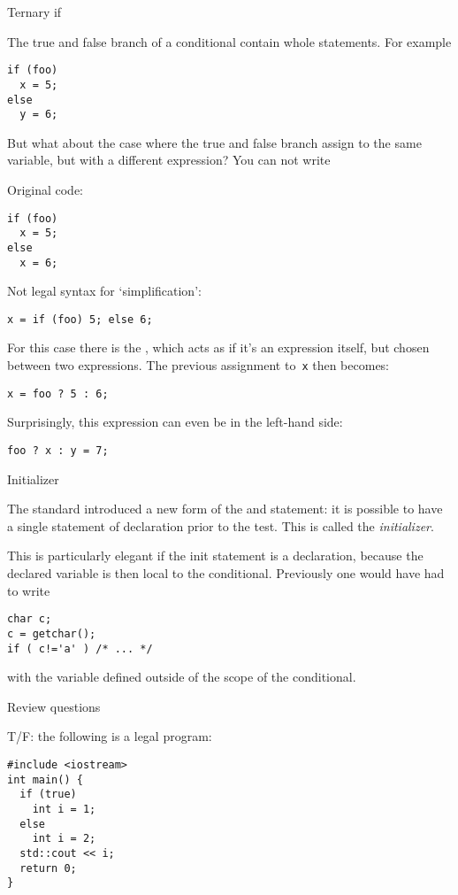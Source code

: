  {Ternary if}

The true and false branch of a conditional contain whole statements.
For example
\begin{lstlisting}
if (foo)
  x = 5;
else
  y = 6;
\end{lstlisting}
But what about the case where the true and false branch
assign to the same variable, but with a different expression?
You can not write
\begin{multicols}{2}
Original code:
\begin{lstlisting}
if (foo)
  x = 5;
else
  x = 6;
\end{lstlisting}
\columnbreak
Not legal syntax for `simplification':
\begin{lstlisting}
x = if (foo) 5; else 6; 
\end{lstlisting}
\end{multicols}
For this case there is the ,
which acts as if it's an expression itself, but chosen
between two expressions.
The previous assignment to~\lstinline{x} then becomes:
\begin{lstlisting}
x = foo ? 5 : 6;
\end{lstlisting}
Surprisingly, this expression can even be in the left-hand side:
\begin{lstlisting}
foo ? x : y = 7;
\end{lstlisting}

 {Initializer}
\label{sec:if-init}

The  standard introduced a new form of the  and
 statement: it is possible to have a single
statement of declaration prior to the test.
This is called the
\emph{initializer}.


This is particularly elegant if the init statement is a declaration,
because the declared variable is then local to the conditional.
Previously one would have had to write
\begin{lstlisting}
char c;
c = getchar();
if ( c!='a' ) /* ... */
\end{lstlisting}
with the variable defined outside of the scope of the conditional.


 {Review questions}

\begin{review}
  T/F: the following is a legal program:
\begin{lstlisting}
#include <iostream>
int main() {
  if (true)
    int i = 1;
  else
    int i = 2;
  std::cout << i;
  return 0;
}
\end{lstlisting}
\end{review}

